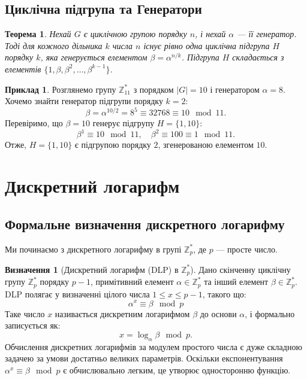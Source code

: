\documentclass[12pt]{report}
\theoremstyle{definition}
\newtheorem{definition}{Визначення}[chapter]
\newtheorem{example}{Приклад}[chapter]
\theoremstyle{plain}
\newtheorem{theorem}{Теорема}[chapter]
\begin{document}
\subsection{Циклічна підгрупа та Генератори}

\begin{theorem}
Нехай \( G \) є циклічною групою порядку \( n \), і нехай \( \alpha \) — її генератор. Тоді для кожного дільника \( k \) числа \( n \) існує рівно одна циклічна підгрупа \( H \) порядку \( k \), яка генерується елементом \( \beta = \alpha^{n/k} \). Підгрупа \( H \) складається з елементів \( \{1, \beta, \beta^2, \ldots, \beta^{k-1}\} \).
\end{theorem}

\begin{example}
Розглянемо групу \( \mathbb{Z}^*_{11} \) з порядком \( |G| = 10 \) і генератором \( \alpha = 8 \). Хочемо знайти генератор підгрупи порядку \( k = 2 \):
\[
\beta = \alpha^{10/2} = 8^5 \equiv 32768 \equiv 10 \mod 11.
\]
Перевіримо, що \( \beta = 10 \) генерує підгрупу \( H = \{1, 10\} \):
\[
\beta^1 \equiv 10 \mod 11, \quad \beta^2 \equiv 100 \equiv 1 \mod 11.
\]
Отже, \( H = \{1, 10\} \) є підгрупою порядку \( 2 \), згенерованою елементом \( 10 \).
\end{example}



\section{Дискретний логарифм}

\subsection{Формальне визначення дискретного логарифму}

Ми починаємо з дискретного логарифму в групі \( \mathbb{Z}^*_p \), де \( p \) — просте число.

\begin{definition}[Дискретний логарифм (DLP) в \( \mathbb{Z}^*_p \)]
Дано скінченну циклічну групу \( \mathbb{Z}^*_p \) порядку \( p - 1 \), примітивний елемент \( \alpha \in \mathbb{Z}^*_p \) та інший елемент \( \beta \in \mathbb{Z}^*_p \). DLP полягає у визначенні цілого числа \( 1 \leq x \leq p - 1 \), такого що:
\[
\alpha^x \equiv \beta \mod p
\]
Таке число \( x \) називається дискретним логарифмом \( \beta \) до основи \( \alpha \), і формально записується як:
\[
x = \log_\alpha \beta \mod p.
\]
Обчислення дискретних логарифмів за модулем простого числа є дуже складною задачею за умови достатньо великих параметрів. Оскільки експонентування \( \alpha^x \equiv \beta \mod p \) є обчислювально легким, це утворює односторонню функцію.
\end{definition}
\end{document}
